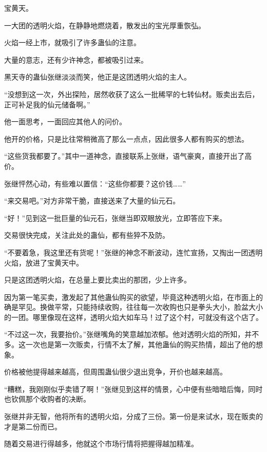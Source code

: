 
\begin{this_body}

宝黄天。

一大团的透明火焰，在静静地燃烧着，散发出的宝光厚重恢弘。

火焰一经上市，就吸引了许多蛊仙的注意。

大量的意志，还有少许神念，都被吸引过来。

黑天寺的蛊仙张继淡淡而笑，他正是这团透明火焰的主人。

“没想到这一次，外出探险，居然收获了这么一批稀罕的七转仙材。贩卖出去后，正可补足我的仙元储备啊。”

他一面思考，一面回应其他人的问价。

他开的价格，只是比往常稍微高了那么一点点，因此很多人都有购买的想法。

“这些货我都要了。”其中一道神念，直接联系上张继，语气豪爽，直接开出了高价。

张继怦然心动，有些难以置信：“这些你都要？这价钱……”

“来交易吧。”对方非常干脆，直接送来了大量的仙元石。

“好！”见到这一批巨量的仙元石，张继当即双眼放光，立即答应下来。

交易很快完成，关注此处的蛊仙，都有些猝不及防。

“不要着急，我这里还有货呢！”张继的神念不断波动，连忙宣扬，又掏出一团透明火焰，放进了宝黄天中。

只是这团透明火焰，在总量上要比卖出的那团，少上许多。

因为第一笔买卖，激发起了其他蛊仙购买的欲望，毕竟这种透明火焰，在市面上的确是罕见。换做平常，只能持续收购，往往每一次收购也只是拳头大小，脸盆大小的一团。哪里像现在这样，透明火焰大如车马！过了这个村，可就没有这个店了。

“不过这一次，我要抬价。”张继嘴角的笑意越加浓郁。他对透明火焰的所知，并不多。这一次也是第一次贩卖，行情不太了解，其他蛊仙的购买热情，超出了他的想象。

价格被他提得越来越高，但周围蛊仙很少退出竞争，开价也越来越高。

“糟糕，我刚刚似乎卖错了啊！”张继见到这样的情景，心中便有些暗暗后悔，同时也钦佩那个收购者的决断。

张继并非无智，他将所有的透明火焰，分成了三份。第一份是来试水，现在贩卖的才是第二份而已。

随着交易进行得越多，他就这个市场行情将把握得越加精准。


\end{this_body}
